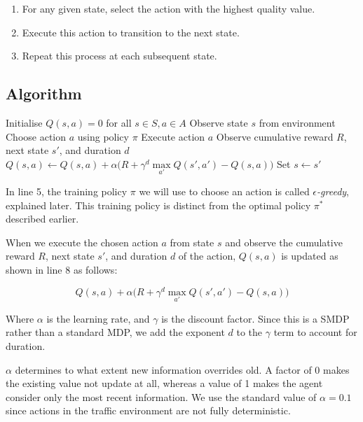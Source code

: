 \documentclass[a4paper]{report}
\begin{document}
\begin{enumerate}
  \item For any given state, select the action with the highest quality value.
  \item Execute this action to transition to the next state.
  \item Repeat this process at each subsequent state.
\end{enumerate}

\subsection{Algorithm}

\begin{algorithm}[H]
  \caption{Tabular Q-Learning}
  \begin{algorithmic}[1]
  \State Initialise $Q(s,a) = 0$ for all $s \in S, a \in A$
      \State Observe state $s$ from environment
          \State Choose action $a$ using policy $\pi$
          \State Execute action $a$
          \State Observe cumulative reward $R$, next state $s'$, and duration $d$
          \State $Q(s,a) \leftarrow Q(s,a) + \alpha \Big(R + \gamma^d \underset{a'}{\max} Q(s',a') - Q(s,a)\Big)$
          \State Set $s \leftarrow s'$
      \EndFor
  \EndFor
  \end{algorithmic}
\end{algorithm}

In line 5, the training policy $\pi$ we will use to choose an action is called \emph{$\epsilon$-greedy}, explained later. This training policy is distinct from the optimal policy $\pi^*$ described earlier.

When we execute the chosen action $a$ from state $s$ and observe the cumulative reward $R$, next state $s'$, and duration $d$ of the action, $Q(s,a)$ is updated as shown in line 8 as follows:

\[
  Q(s,a) + \alpha \Big(R + \gamma^d \underset{a'}{\max} Q(s',a') - Q(s,a)\Big)
\]

Where $\alpha$ is the learning rate, and $\gamma$ is the discount factor. Since this is a SMDP rather than a standard MDP, we add the exponent $d$ to the $\gamma$ term to account for duration.

$\alpha$ determines to what extent new information overrides old. A factor of 0 makes the existing value not update at all, whereas a value of 1 makes the agent consider only the most recent information. We use the standard value of $\alpha=0.1$ since actions in the traffic environment are not fully deterministic.
\end{document}
